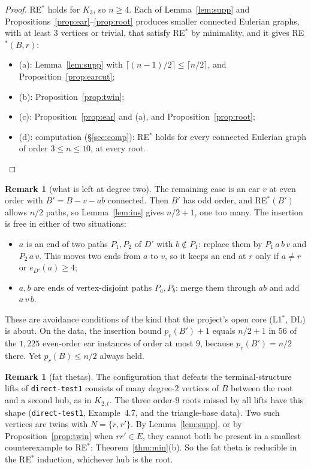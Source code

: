 \documentclass[11pt]{amsart}
\theoremstyle{definition}
\newtheorem{remark}[theorem]{Remark}
\newcommand{\pr}{p_r}
\begin{document}
\begin{proof}
RE$^*$ holds for $K_3$, so $n\ge4$. Each of Lemma~\ref{lem:supp} and Propositions~\ref{prop:ear}--\ref{prop:root}
produces smaller connected Eulerian graphs, with at least $3$ vertices or trivial, that satisfy
RE$^*$ by minimality, and it gives RE$^*(B,r)$:
\begin{itemize}[leftmargin=*]
\item (a): Lemma~\ref{lem:supp} with $\lceil(n-1)/2\rceil\le\lceil n/2\rceil$, and
Proposition~\ref{prop:earcut};
\item (b): Proposition~\ref{prop:twin};
\item (c): Proposition~\ref{prop:ear} and (a), and Proposition~\ref{prop:root};
\item (d): computation (\S\ref{sec:comp}): RE$^*$ holds for every connected Eulerian graph of order
$3\le n\le10$, at every root.
\end{itemize}
\end{proof}

\begin{remark}[what is left at degree two]\label{rem:even}
The remaining case is an ear $v$ at even order with $B'=B-v-ab$ connected. Then $B'$ has odd order,
and RE$^*(B')$ allows $n/2$ paths, so Lemma~\ref{lem:ins} gives $n/2+1$, one too many. The insertion
is free in either of two situations:
\begin{itemize}[leftmargin=*]
\item $a$ is an end of two paths $P_1,P_2$ of $D'$ with $b\notin P_1$: replace them by $P_1\,a\,b\,v$
and $P_2\,a\,v$. This moves two ends from $a$ to $v$, so it keeps an end at $r$ only if $a\ne r$ or
$e_{D'}(a)\ge4$;
\item $a,b$ are ends of vertex-disjoint paths $P_a,P_b$: merge them through $ab$ and add $a\,v\,b$.
\end{itemize}
These are avoidance conditions of the kind that the project's open core (L1$^*$, DL) is about. On the
data, the insertion bound $\pr(B')+1$ equals $n/2+1$ in $56$ of the $1{,}225$ even-order ear instances
of order at most $9$, because $\pr(B')=n/2$ there. Yet $\pr(B)\le n/2$ always held.
\end{remark}

\begin{remark}[fat thetas]\label{rem:theta}
The configuration that defeats the terminal-structure lifts of \texttt{direct-test1} consists of many
degree-$2$ vertices of $B$ between the root and a second hub, as in $K_{2,t}$. The three order-$9$
roots missed by all lifts have this shape (\texttt{direct-test1}, Example~4.7, and the triangle-base
data). Two such vertices are twins with $N=\{r,r'\}$. By Lemma~\ref{lem:supp}, or by
Proposition~\ref{prop:twin} when $rr'\in E$, they cannot both be present in a smallest counterexample
to RE$^*$: Theorem~\ref{thm:min}(b). So the fat theta is reducible in the RE$^*$ induction,
whichever hub is the root.
\end{remark}
\end{document}
